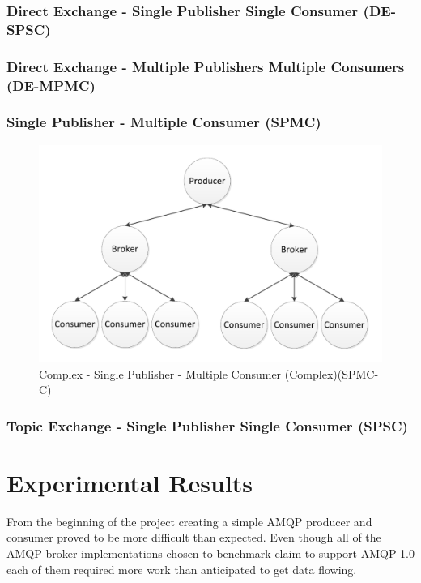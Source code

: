 \documentclass{thesis}
\begin{document}
\subsection{Direct Exchange - Single Publisher Single Consumer (DE-SPSC)}
\subsection{Direct Exchange - Multiple Publishers Multiple Consumers (DE-MPMC)}
\subsection{Single Publisher - Multiple Consumer (SPMC)}



\begin{figure}
\centering
\includegraphics{complicated_fanout}  
\caption{Complex - Single Publisher - Multiple Consumer (Complex)(SPMC-C)}
\end{figure}

\subsection{Topic Exchange - Single Publisher Single Consumer (SPSC)}


\chapter{Experimental Results}

From the beginning of the project creating a simple AMQP producer and consumer proved to be more difficult than expected.  Even though all of the AMQP broker implementations chosen to benchmark claim to support AMQP 1.0 each of them required more work than anticipated to get data flowing.  
\end{document}
